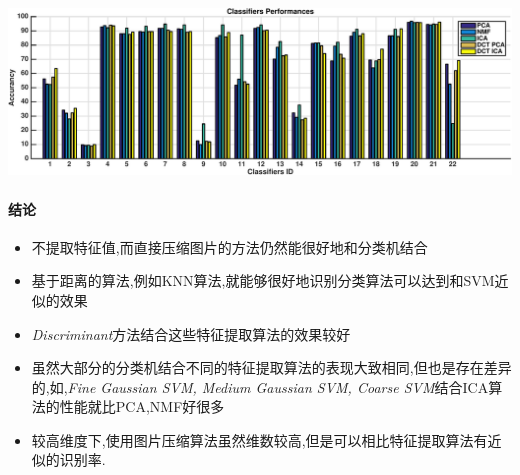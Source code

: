 	\begin{center}
	\begin{minipage}[t]{\linewidth}
	\center
	{
	\includegraphics[width=\textwidth]{Img/pni_res} 
	}
	\end{minipage}
	\medskip
	\end{center}
	
\paragraph{结论}
\begin{itemize}
	\item 不提取特征值,而直接压缩图片的方法仍然能很好地和分类机结合
	\item 基于距离的算法,例如KNN算法,就能够很好地识别分类算法可以达到和SVM近似的效果
	\item \textit{Discriminant}方法结合这些特征提取算法的效果较好
	\item 虽然大部分的分类机结合不同的特征提取算法的表现大致相同,但也是存在差异的,如,\textit{Fine Gaussian SVM, Medium Gaussian SVM, Coarse SVM}结合ICA算法的性能就比PCA,NMF好很多
	\item 较高维度下,使用图片压缩算法虽然维数较高,但是可以相比特征提取算法有近似的识别率.
\end{itemize}

